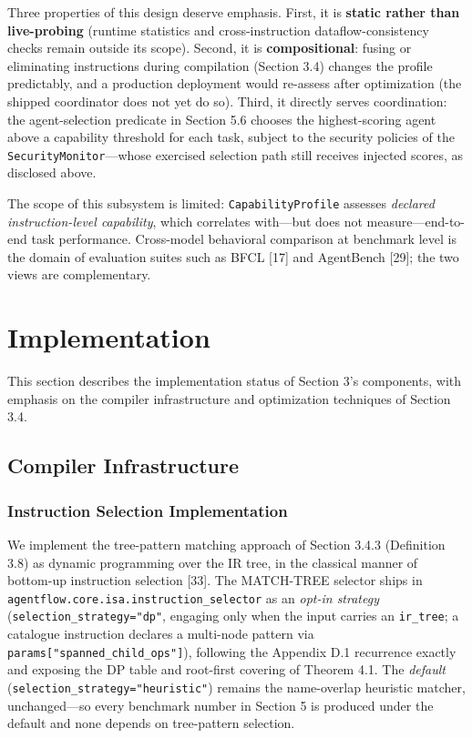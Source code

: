 \documentclass[
  sigconf,
  anonymous]{acmart}
\newcounter{none} %
\begin{document}
Three properties of this design deserve emphasis. First, it is
\textbf{static rather than live-probing} (runtime statistics and
cross-instruction dataflow-consistency checks remain outside its scope).
Second, it is \textbf{compositional}: fusing or eliminating instructions
during compilation (Section 3.4) changes the profile predictably, and a
production deployment would re-assess after optimization (the shipped
coordinator does not yet do so). Third, it directly serves coordination:
the agent-selection predicate in Section 5.6 chooses the highest-scoring
agent above a capability threshold for each task, subject to the
security policies of the \texttt{SecurityMonitor}---whose exercised
selection path still receives injected scores, as disclosed above.

The scope of this subsystem is limited: \texttt{CapabilityProfile}
assesses \emph{declared instruction-level capability}, which correlates
with---but does not measure---end-to-end task performance. Cross-model
behavioral comparison at benchmark level is the domain of evaluation
suites such as BFCL {[}17{]} and AgentBench {[}29{]}; the two views are
complementary.

\section{Implementation}\label{implementation}

This section describes the implementation status of Section 3's
components, with emphasis on the compiler infrastructure and
optimization techniques of Section 3.4.

\subsection{Compiler Infrastructure}\label{compiler-infrastructure}

\subsubsection{Instruction Selection
Implementation}\label{instruction-selection-implementation}

We implement the tree-pattern matching approach of Section 3.4.3
(Definition 3.8) as dynamic programming over the IR tree, in the
classical manner of bottom-up instruction selection {[}33{]}. The
MATCH-TREE selector ships in
\texttt{agentflow.core.isa.instruction\_selector} as an \emph{opt-in
strategy} (\texttt{selection\_strategy="dp"}, engaging only when the
input carries an \texttt{ir\_tree}; a catalogue instruction declares a
multi-node pattern via \texttt{params{[}"spanned\_child\_ops"{]}}),
following the Appendix D.1 recurrence exactly and exposing the DP table
and root-first covering of Theorem 4.1. The \emph{default}
(\texttt{selection\_strategy="heuristic"}) remains the name-overlap
heuristic matcher, unchanged---so every benchmark number in Section 5 is
produced under the default and none depends on tree-pattern selection.
\end{document}
